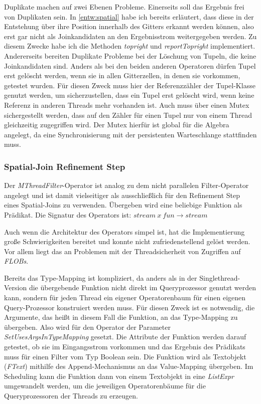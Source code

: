 \documentclass[a4paper,12pt,twoside]{article}
\newcommand{\Fb}[1]{\textit{#1}} %
\begin{document}
Duplikate machen auf zwei Ebenen Probleme. Einerseits soll das Ergebnis frei von Duplikaten sein. In \autoref{entw:spatial} habe ich bereits erläutert, dass diese in der Entstehung über ihre Position innerhalb des Gitters erkannt werden können, also erst gar nicht als Joinkandidaten an den Ergebnisstrom weitergegeben werden. Zu diesem Zwecke habe ich die Methoden \Fb{topright} und \Fb{reportTopright} implementiert. Andererseits bereiten Duplikate Probleme bei der Löschung von Tupeln, die keine Joinkandidaten sind. Anders als bei den beiden anderen Operatoren dürfen Tupel erst gelöscht werden, wenn sie in allen Gitterzellen, in denen sie vorkommen, getestet wurden. Für diesen Zweck muss hier der Referenzzähler der Tupel-Klasse genutzt werden, um sicherzustellen, dass ein Tupel erst gelöscht wird, wenn keine Referenz in anderen Threads mehr vorhanden ist. Auch muss über einen Mutex sichergestellt werden, dass auf den Zähler für einen Tupel nur von einem Thread gleichzeitig zugegriffen wird. Der Mutex hierfür ist global für die Algebra angelegt, da eine Synchronisierung mit der persistenten Warteschlange stattfinden muss.

\subsubsection{Spatial-Join Refinement Step}
\label{impl:refinement}

Der \Fb{MThreadFilter}-Operator ist analog zu dem nicht parallelen Filter-Operator angelegt und ist damit vielseitiger als ausschließlich für den Refinement Step eines Spatial-Joins zu verwenden. Übergeben wird eine beliebige Funktion als Prädikat. Die Signatur des Operators ist: \newline
$stream~x~fun \longrightarrow stream$

Auch wenn die Architektur des Operators simpel ist, hat die Implementierung große Schwierigkeiten bereitet und konnte nicht zufriedenstellend gelöst werden. Vor allem liegt das an Problemen mit der Threadsicherheit von Zugriffen auf \Fb{FLOBs}.

Bereits das Type-Mapping ist kompliziert, da anders als in der Singlethread-Version die übergebende Funktion nicht direkt im Queryprozessor genutzt werden kann, sondern für jeden Thread ein eigener Operatorenbaum für einen eigenen Query-Prozessor konstruiert werden muss. Für diesen Zweck ist es notwendig, die Argumente, das heißt in diesem Fall die Funktion, an das Type-Mapping zu übergeben. Also wird für den Operator der Parameter \Fb{SetUsesArgsInTypeMapping} gesetzt. Die Attribute der Funktion werden darauf getestet, ob sie im Eingangsstrom vorkommen und das Ergebnis des Prädikats muss für einen Filter vom Typ Boolean sein. Die Funktion wird als Textobjekt (\Fb{FText}) mithilfe des Append-Mechanismus an das Value-Mapping übergeben. Im Scheduling kann die Funktion dann von einem Textobjekt in eine \Fb{ListExpr} umgewandelt werden, um die jeweiligen Operatorenbäume für die Queryprozessoren der Threads zu erzeugen.
\end{document}
